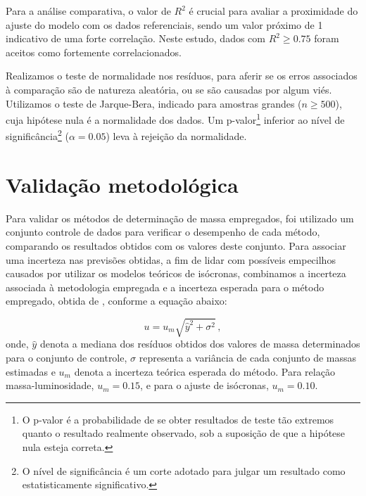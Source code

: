         Para a análise comparativa, o valor de \(R^2\) é crucial para avaliar a proximidade do ajuste do modelo com os dados referenciais, sendo um valor próximo de 1 indicativo de uma forte correlação. Neste estudo, dados com \(R^2 \geq 0.75\) foram aceitos como fortemente correlacionados.
        
        Realizamos o teste de normalidade nos resíduos, para aferir se os erros associados à comparação são de natureza aleatória, ou se são causadas por algum viés. Utilizamos o teste de Jarque-Bera, indicado para amostras grandes (\(n \geq 500\)), cuja hipótese nula é a normalidade dos dados. Um p-valor\footnote{O p-valor é a probabilidade de se obter resultados de teste tão extremos quanto o resultado realmente observado, sob a suposição de que a hipótese nula esteja correta.} inferior ao nível de significância\footnote{ O nível de significância é um corte adotado para julgar um resultado como estatisticamente significativo.} (\(\alpha = 0.05\)) leva à rejeição da normalidade.
       
	\section{Validação metodológica}\label{sec:validacao}
		
		Para validar os métodos de determinação de massa empregados, foi utilizado um conjunto controle de dados para verificar o desempenho de cada método, comparando os resultados obtidos com os valores deste conjunto. Para associar uma incerteza nas previsões obtidas, a fim de lidar com possíveis empecilhos causados por utilizar os modelos teóricos de isócronas, combinamos a incerteza associada à metodologia empregada e a incerteza esperada para o método empregado, obtida de , conforme a equação abaixo:
		
		\begin{equation}
			\label{erro}
			u = u_{m} \sqrt{\hat{y}^2 + \sigma^2} \, ,
		\end{equation}
		\noindent onde, \( \hat{y}\) denota a mediana dos resíduos obtidos dos valores de massa determinados para o conjunto de controle, \( \sigma\) representa a variância de cada conjunto de massas estimadas e \( u_m \) denota a incerteza teórica esperada do método. Para relação massa-luminosidade, \(u_m = 0.15\), e para o ajuste de isócronas, \(u_m = 0.10\).
		